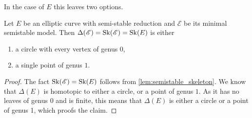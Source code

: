 In the case of $E$ this leaves two options. 
\begin{lemma}
	Let $E$ be an elliptic curve with semi-stable reduction and $\mathscr E$ be its minimal semistable model. 
	Then $\Delta(\mathscr E) = \operatorname{Sk}(\mathscr E) = \operatorname{Sk}(E)$ is either 
	\begin{enumerate}
		\item a circle with every vertex of genus $0$,
		\item a single point of genus  $1$. 
	\end{enumerate}
\end{lemma}
\begin{proof}
	The fact $\operatorname{Sk}(\mathscr E) = \operatorname{Sk}(E)$ follows from \cref{lem:semistable_skeleton}. 
	We know that $\Delta(E)$ is homotopic to either a circle, or a point of genus $1$. 
	As it has no leaves of genus $0$ and is finite, this means that $\Delta(E)$ is either a circle or a point of genus 1, which proofs the claim.
\end{proof}



